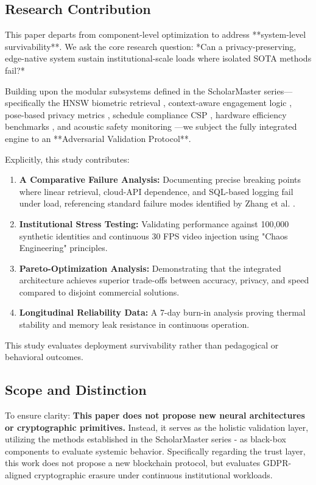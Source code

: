 \documentclass[conference]{IEEEtran}
\begin{document}
\subsection{Research Contribution}
This paper departs from component-level optimization to address **system-level survivability**. We ask the core research question: *Can a privacy-preserving, edge-native system sustain institutional-scale loads where isolated SOTA methods fail?*

Building upon the modular subsystems defined in the ScholarMaster series—specifically the HNSW biometric retrieval \cite{p1}, context-aware engagement logic \cite{p2}, pose-based privacy metrics \cite{p3}, schedule compliance CSP \cite{p4}, hardware efficiency benchmarks \cite{p5}, and acoustic safety monitoring \cite{p6}—we subject the fully integrated engine to an **Adversarial Validation Protocol**.

Explicitly, this study contributes:
\begin{enumerate}
    \item \textbf{A Comparative Failure Analysis:} Documenting precise breaking points where linear retrieval, cloud-API dependence, and SQL-based logging fail under load, referencing standard failure modes identified by Zhang et al. \cite{b10}.
    \item \textbf{Institutional Stress Testing:} Validating performance against 100,000 synthetic identities and continuous 30 FPS video injection using "Chaos Engineering" principles.
    \item \textbf{Pareto-Optimization Analysis:} Demonstrating that the integrated architecture achieves superior trade-offs between accuracy, privacy, and speed compared to disjoint commercial solutions.
    \item \textbf{Longitudinal Reliability Data:} A 7-day burn-in analysis proving thermal stability and memory leak resistance in continuous operation.
\end{enumerate}

This study evaluates deployment survivability rather than pedagogical or behavioral outcomes.

\subsection{Scope and Distinction}
To ensure clarity: \textbf{This paper does not propose new neural architectures or cryptographic primitives.} Instead, it serves as the holistic validation layer, utilizing the methods established in the ScholarMaster series \cite{p1}-\cite{p6} as black-box components to evaluate systemic behavior. Specifically regarding the trust layer, this work does not propose a new blockchain protocol, but evaluates GDPR-aligned cryptographic erasure \cite{b6} under continuous institutional workloads.
\end{document}
